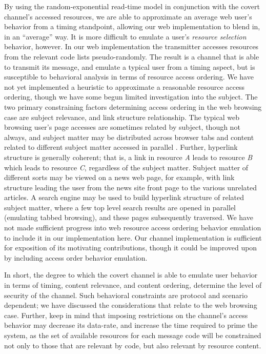 \documentclass[10pt, conference]{IEEEtran}
\begin{document}
By using the random-exponential read-time model in conjunction with the covert channel's accessed resources, we are able to approximate an average web user's behavior from a timing standpoint, allowing our web implementation to blend in, in an ``average'' way.  It is more difficult to emulate a user's {\em resource selection} behavior, however.  In our web implementation the transmitter accesses resources from the relevant code lists pseudo-randomly.  The result is a channel that is able to transmit its message, and emulate a typical user from a timing aspect, but is susceptible to behavioral analysis in terms of resource access ordering.  We have not yet implemented a heuristic to approximate a reasonable resource access ordering, though we have some begun limited investigation into the subject.  The two primary constraining factors determining access ordering in the web browsing case are subject relevance, and link structure relationship.  The typical web browsing user's page accesses are sometimes related by subject, though not always, and subject matter may be distributed across browser tabs and content related to different subject matter accessed in parallel \cite{Weinreich06}.  Further, hyperlink structure is generally coherent; that is, a link in resource {\em A} leads to resource {\em B} which leads to resource {\em C}, regardless of the subject matter.  Subject matter of different sorts may be viewed on a news web page, for example, with link structure leading the user from the news site front page to the various unrelated articles.  A search engine may be used to build hyperlink structure of related subject matter, where a few top level search results are opened in parallel (emulating tabbed browsing), and these pages subsequently traversed.  We have not made sufficient progress into web resource access ordering behavior emulation to include it in our implementation here.  Our channel implementation is sufficient for exposition of its motivating contributions, though it could be improved upon by including access order behavior emulation.

In short, the degree to which the covert channel is able to emulate user behavior in terms of timing, content relevance, and content ordering, determine the level of security of the channel.  Such behavioral constraints are protocol and scenario dependent; we have discussed the considerations that relate to the web browsing case.  Further, keep in mind that imposing restrictions on the channel's access behavior may decrease its data-rate, and increase the time required to prime the system, as the set of available resources for each message code will be constrained not only to those that are relevant by code, but also relevant by resource content.
\end{document}
